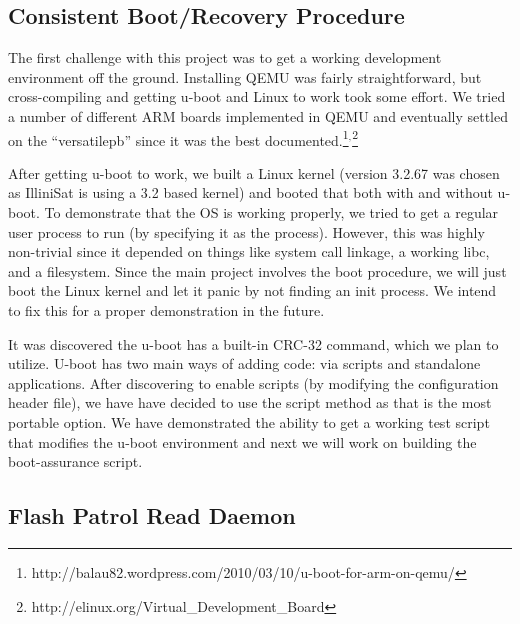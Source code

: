 \subsection{Consistent Boot/Recovery Procedure}
The first challenge with this project was to get a working development
environment off the ground.  Installing QEMU was fairly straightforward, but
cross-compiling and getting u-boot and Linux to work took some effort.  We tried
a number of different ARM boards implemented in QEMU and eventually settled on
the ``versatilepb'' since it was the best documented.\footnote{http://balau82.wordpress.com/2010/03/10/u-boot-for-arm-on-qemu/}$^{,}$\footnote{http://elinux.org/Virtual\_Development\_Board}

After getting u-boot to work, we built a Linux kernel (version 3.2.67 was chosen
as IlliniSat is using a 3.2 based kernel) and booted that both with and without 
u-boot.  To demonstrate that the OS is working properly, we tried to get a
regular user process to run (by specifying it as the  process).
However, this was highly non-trivial since it depended on things like system
call linkage, a working libc, and a filesystem.  Since the main project involves
the boot procedure, we will just boot the Linux kernel and let it panic by not
finding an init process. We intend to fix this for a proper demonstration in the
future.

It was discovered the u-boot has a built-in CRC-32 command, which we plan to
utilize. U-boot has two main ways of adding code: via scripts and standalone
applications.  After discovering to enable scripts (by modifying the
configuration header file), we have have decided to use the script method as
that is the most portable option. We have demonstrated the ability to get a
working test script that modifies the u-boot environment and next we will work
on building the boot-assurance script.  


\subsection{Flash Patrol Read Daemon}

